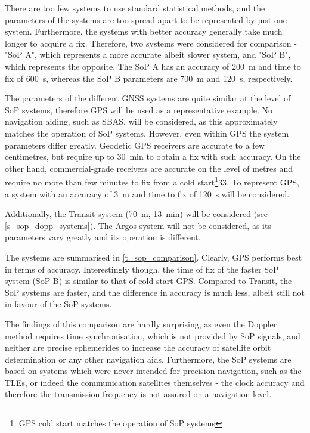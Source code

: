 There are too few systems to use standard statistical methods, and the parameters of the systems are too spread apart to be represented by just one system. Furthermore, the systems with better accuracy generally take much longer to acquire a fix. Therefore, two systems were considered for comparison - "SoP A", which represents a more accurate albeit slower system, and "SoP B", which represents the opposite. The SoP A has an accuracy of \qty{200}{m} and time to fix of \qty{600}{s}, whereas the SoP B parameters are \qty{700}{m} and \qty{120}{s}, respectively.

The parameters of the different GNSS systems are quite similar at the level of SoP systems\cite{sop23}, therefore GPS will be used as a representative example. No navigation aiding, such as SBAS, will be considered, as this approximately matches the operation of SoP systems. However, even within GPS the system parameters differ greatly. Geodetic GPS receivers are accurate to a few centimetres, but require up to \qty{30}{min} to obtain a fix with such accuracy\cite{sop23}. On the other hand, commercial-grade receivers are accurate on the level of metres and require no more than few minutes to fix from a cold start\footnote{GPS cold start matches the operation of SoP systems}\citep{pos04}{33}. To represent GPS, a system with an accuracy of \qty{3}{m} and time to fix of \qty{120}{s} will be considered.

Additionally, the Transit system (\qty{70}{m}, \qty{13}{min}) will be considered (see \autoref{s_sop_dopp_systems}). The Argos system will not be considered, as its parameters vary greatly and its operation is different.

The systems are summarised in \autoref{t_sop_comparison}. Clearly, GPS performs best in terms of accuracy. Interestingly though, the time of fix of the faster SoP system (SoP B) is similar to that of cold start GPS. Compared to Transit, the SoP systems are faster, and the difference in accuracy is much less, albeit still not in favour of the SoP systems. 

The findings of this comparison are hardly surprising, as even the Doppler method requires time synchronisation, which is not provided by SoP signals, and neither are precise ephemerides to increase the accuracy of satellite orbit determination or any other navigation aids. Furthermore, the SoP systems are based on systems which were never intended for precision navigation, such as the TLEs, or indeed the communication satellites themselves - the clock accuracy and therefore the transmission frequency is not assured on a navigation level.

